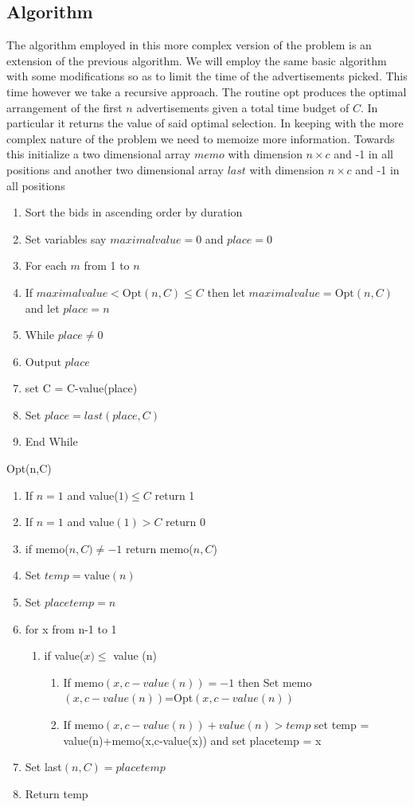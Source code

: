\documentclass{article}
\begin{document}
\subsection{Algorithm}
The algorithm employed in this more complex version of the problem is an extension of the previous algorithm.  We will employ the same basic algorithm with some modifications so as to limit the time of the advertisements picked. This time however we take a recursive approach. The routine opt produces the optimal arrangement of the first $n$ advertisements given a total time budget of $C$. In particular it returns the value of said optimal selection. In keeping with the more complex nature of the problem we need to memoize more information. Towards this initialize a two dimensional array $memo$ with dimension $n\times c$ and -1 in all positions and another two dimensional array $last$ with dimension $n\times c$ and -1 in all positions

\begin{enumerate}
\item Sort the bids in ascending order by duration
\item Set variables say $maximalvalue=0$ and $place = 0$
\item For each $m$ from 1 to $n$
\item If  $maximalvalue<\mathrm{Opt}(n,C) \leq C$ then let $maximalvalue = \mathrm{Opt}(n,C)$ and let $place = n$
\item While $place \neq 0$
\item Output $place$ 
\item set C = C-value(place)
\item Set $place=last(place,C)$
\item End While
\end{enumerate}


\begin{center} Opt(n,C)\end{center}
\begin{enumerate}
\item If $n = 1$ and value($1)\leq C$ return 1
\item If $n = 1$ and value$(1)> C$ return 0
\item if memo($n,C) \neq -1$ return memo($n,C$)
\item Set $temp = \mathrm{value}(n)$
\item Set $placetemp = n$
\item for x from n-1 to 1
\begin{enumerate}
\item if value($x)\leq $ value (n)
\begin{enumerate}
\item If memo$(x,c-value(n))=-1$  then Set memo$(x,c-value(n))$=Opt$(x,c-value(n))$
\item If memo$(x,c-value(n))+value(n)>temp$ set temp = value(n)+memo(x,c-value(x)) and set placetemp = x
\end{enumerate}
\end{enumerate}
\item Set last$(n,C)=placetemp$
\item Return temp
\end{enumerate}
\end{document}
